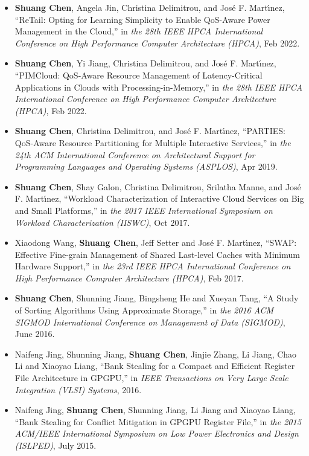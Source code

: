 \documentclass{res}
\begin{document}
\begin{resume}
\begin{itemize}[leftmargin=*]
\item {\bf Shuang Chen}, Angela Jin, Christina Delimitrou, and Jos{\'e} F. Mart{\'\i}nez, ``ReTail: Opting for Learning Simplicity to Enable QoS-Aware Power Management in the Cloud,'' in {\em the 28th IEEE HPCA International Conference on High Performance Computer Architecture (HPCA)}, Feb 2022.

\item {\bf Shuang Chen}, Yi Jiang, Christina Delimitrou, and Jos{\'e} F. Mart{\'\i}nez, ``PIMCloud: QoS-Aware Resource Management of Latency-Critical Applications in Clouds with Processing-in-Memory,'' in {\em the 28th IEEE HPCA International Conference on High Performance Computer Architecture (HPCA)}, Feb 2022.

\item {\bf Shuang Chen}, Christina Delimitrou, and Jos{\'e} F. Mart{\'\i}nez, ``PARTIES: QoS-Aware Resource Partitioning for Multiple Interactive Services,'' in {\em the 24th ACM International Conference on Architectural Support for Programming Languages and Operating Systems (ASPLOS)}, Apr 2019.

\item {\bf Shuang Chen}, Shay Galon, Christina Delimitrou, Srilatha Manne, and Jos{\'e} F. Mart{\'\i}nez, ``Workload Characterization of Interactive Cloud Services on Big and Small Platforms,'' in {\em the 2017 IEEE International Symposium on Workload Characterization (IISWC)}, Oct 2017.

\item Xiaodong Wang, {\bf Shuang Chen}, Jeff Setter and Jos{\'e} F. Mart{\'\i}nez, ``SWAP: Effective Fine-grain Management of Shared Last-level Caches with Minimum Hardware Support,'' in {\em the 23rd IEEE HPCA International Conference on High Performance Computer Architecture (HPCA)}, Feb 2017.

\item  {\bf Shuang Chen}, Shunning Jiang, Bingsheng He and Xueyan Tang, ``A Study of Sorting Algorithms Using Approximate Storage,'' in {\em the 2016 ACM SIGMOD International Conference on Management of Data (SIGMOD)}, June 2016.

\item Naifeng Jing, Shunning Jiang, {\bf Shuang Chen}, Jinjie Zhang, Li Jiang, Chao Li and Xiaoyao Liang, ``Bank Stealing for a Compact and Efficient Register File Architecture in GPGPU,'' in {\em IEEE Transactions on Very Large Scale Integration (VLSI) Systems}, 2016.

\item Naifeng Jing, {\bf Shuang Chen}, Shunning Jiang, Li Jiang and Xiaoyao Liang, ``Bank Stealing for Conflict Mitigation in GPGPU Register File,'' in {\em the 2015 ACM/IEEE International Symposium on Low Power Electronics and Design (ISLPED)}, July 2015.


\end{itemize}
\end{resume}
\end{document}
